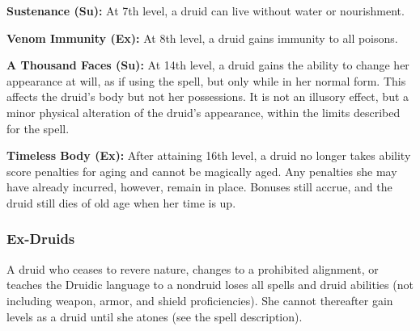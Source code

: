 \textbf{Sustenance (Su):} At 7th level, a druid can live without water or nourishment.

\textbf{Venom Immunity (Ex):} At 8th level, a druid gains immunity to all poisons.

\textbf{A Thousand Faces (Su):} At 14th level, a druid gains the ability to change her appearance at will, as if using the  spell, but only while in her normal form. This affects the druid's body but not her possessions. It is not an illusory effect, but a minor physical alteration of the druid's appearance, within the limits described for the spell.

\textbf{Timeless Body (Ex):} After attaining 16th level, a druid no longer takes ability score penalties for aging and cannot be magically aged. Any penalties she may have already incurred, however, remain in place. Bonuses still accrue, and the druid still dies of old age when her time is up.

\subsubsection{Ex-Druids}
A druid who ceases to revere nature, changes to a prohibited alignment, or teaches the Druidic language to a nondruid loses all spells and druid abilities (not including weapon, armor, and shield proficiencies). She cannot thereafter gain levels as a druid until she atones (see the  spell description).




